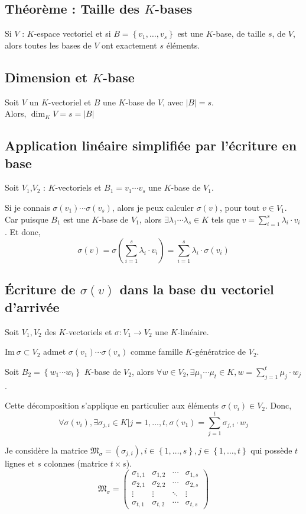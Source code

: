 \documentclass[a4paper,10pt]{article}
\newcommand{\ap}{ \rightarrow} %
\newcommand{\set}[1]{\left\lbrace #1 \right\rbrace } %
\newcommand{\im}{\mathrm{Im}\:} %
\begin{document}
  \subsection{Théorème : Taille des $K$-bases}
   Si $V$ : $K$-espace vectoriel et si $B=\set{v_1, \hdots, v_s}$ est une $K$-base, de taille $s$, de $V$, alors toutes les bases de $V$ ont exactement $s$ éléments.

  \subsection{Dimension et $K$-base}
   Soit $V$ un $K$-vectoriel et $B$ une $K$-base de $V$, avec $|B|=s$.\\
   Alors, $\dim_K V = s = |B|$

  \subsection{Application linéaire simplifiée par l'écriture en base}
   Soit $V_1$,$V_2$ : $K$-vectoriels et $B_1=v_1 \cdots v_s$ une $K$-base de $V_1$.

   Si je connais $\sigma(v_1) \cdots \sigma(v_s)$, alors je peux calculer $\sigma(v)$, pour tout $v \in V_1$. Car puisque $B_1$ est une $K$-base de $V_1$, alors $\exists \lambda_1 \cdots \lambda_s \in K$ tels que $v=\sum^{s}_{i=1} \lambda_i \cdot v_i$. Et donc,
   $$\sigma(v) = \sigma( \sum^{s}_{i=1} \lambda_i \cdot v_i) = \sum^{s}_{i=1} \lambda_i \cdot \sigma(v_i)$$

  \subsection{Écriture de $\sigma(v)$ dans la base du vectoriel d'arrivée}
   Soit $V_1, V_2$ des $K$-vectoriels et $\sigma : V_1 \ap V_2$ une $K$-linéaire.

   $\im \sigma \subset V_2$ admet $\sigma(v_1) \cdots \sigma(v_s)$ comme famille $K$-génératrice de $V_2$.

   Soit $B_2=\set{w_1 \cdots w_t}$ $K$-base de $V_2$, alors $\forall w \in V_2, \exists \mu_1 \cdots \mu_t \in K, w=\sum^{t}_{j=1} \mu_j \cdot w_j$.

   Cette décomposition s'applique en particulier aux éléments $\sigma(v_i) \in V_2$. Donc,
   $$\forall \sigma(v_i), \exists \sigma_{j,i} \in K | j=1,\hdots, t, \sigma(v_1) = \sum^{t}_{j=1} \sigma_{j,i} \cdot w_j$$

   Je considère la matrice $\mathfrak{M}_\sigma = \left( \sigma_{j,i} \right), i\in \set{1, \hdots, s}, j \in \set{1, \hdots, t}$ qui possède $t$ lignes et $s$ colonnes (matrice $t \times s$).
   $$\mathfrak{M}_\sigma =
   \left(
    \begin{matrix}
     \sigma_{1,1} & \sigma_{1,2} & \cdots & \sigma_{1,s} \\
     \sigma_{2,1} & \sigma_{2,2} & \cdots & \sigma_{2,s} \\
     \vdots       & \vdots       & \ddots & \vdots \\
     \sigma_{t,1} & \sigma_{t,2} & \cdots & \sigma_{t,s}
    \end{matrix}
   \right)
   $$
\end{document}
